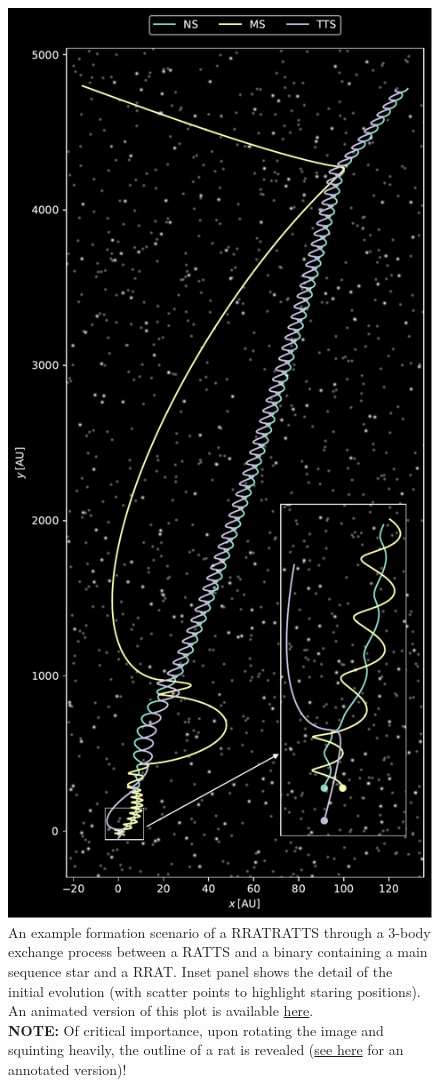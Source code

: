 \documentclass[twocolumn, twocolappendix]{aastex631}
\newcommand{\tauriRAT}{RATTS\xspace}
\newcommand{\radioRAT}{RRAT\xspace}
\newcommand{\binaryRAT}{RRATRATTS\xspace}
\begin{document}
\begin{figure}[htb]
    \centering
    \includegraphics[width=\columnwidth]{rat_formation.pdf}
    \caption{An example formation scenario of a \binaryRAT through a 3-body exchange process between a \tauriRAT and a binary containing a main sequence star and a \radioRAT. Inset panel shows the detail of the initial evolution (with scatter points to highlight staring positions). An animated version of this plot is available \href{https://www.tomwagg.com}{here}.\\\textbf{NOTE:} Of critical importance, upon rotating the image and squinting heavily, the outline of a rat is revealed (\href{https://www.tomwagg.com}{see here} for an annotated version)!}
    \label{fig:rat_rebounding}
\end{figure}
\end{document}
